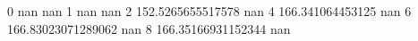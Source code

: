0 nan nan
1 nan nan
2 152.5265655517578 nan
4 166.341064453125 nan
6 166.83023071289062 nan
8 166.35166931152344 nan
